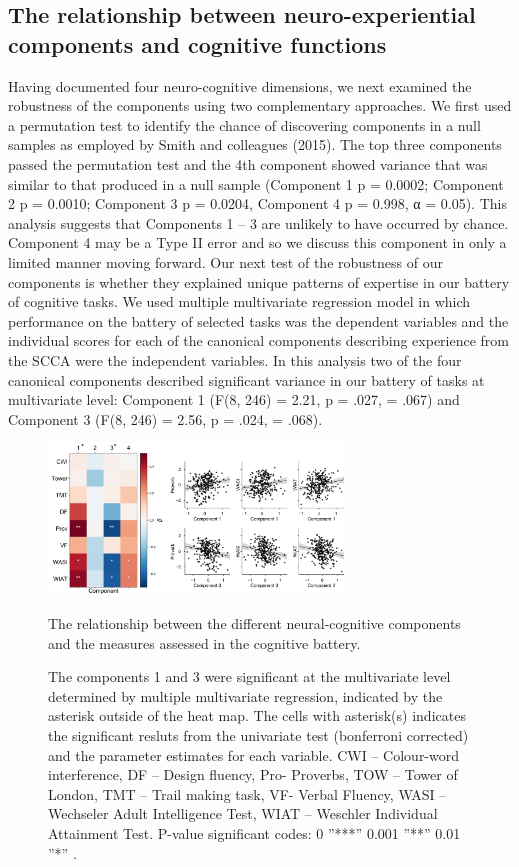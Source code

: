 \subsection{The relationship between neuro-experiential components and cognitive functions}
\label{study2:results:manova}
Having documented four neuro-cognitive dimensions, we next examined the robustness of the components using two complementary approaches. We first used a permutation test to identify the chance of discovering components in a null samples as employed by Smith and colleagues (2015). The top three components passed the permutation test and the 4th component showed variance that was similar to that produced in a null sample (Component 1 p = 0.0002; Component 2 p = 0.0010; Component 3 p = 0.0204, Component 4 p = 0.998, α = 0.05). This analysis suggests that Components 1 – 3 are unlikely to have occurred by chance. Component 4 may be a Type II error and so we discuss this component in only a limited manner moving forward.
Our next test of the robustness of our components is whether they explained unique patterns of expertise in our battery of cognitive tasks. We used multiple multivariate regression model in which performance on the battery of selected tasks was the dependent variables and the individual scores for each of the canonical components describing experience from the SCCA were the independent variables. In this analysis two of the four canonical components described significant variance in our battery of tasks at multivariate level: Component 1 (F(8, 246) = 2.21, p = .027, \paretasquared = .067) and Component 3 (F(8, 246) = 2.56, p = .024, \paretasquared = .068). 
\begin{figure}[H]
    \centering
    \includegraphics[width=0.7\textwidth]{chapters/img/study2fig3.png}
    \caption{The relationship between the different neural-cognitive components and the measures assessed in the cognitive battery.} 
    \caption*{
    \footnotesize{
    The components 1 and 3 were significant at the multivariate level determined by multiple multivariate regression, indicated by the asterisk outside of the heat map. The cells with asterisk(s) indicates the significant resluts from the univariate test (bonferroni corrected) and the parameter estimates for each variable. CWI – Colour-word interference, DF – Design fluency, Pro- Proverbs, TOW – Tower of London, TMT – Trail making task, VF- Verbal Fluency, WASI – Wechseler Adult Intelligence Test, WIAT – Weschler Individual Attainment Test. P-value significant codes:  0 ”***” 0.001 ”**” 0.01 ”*” .}
    }
    \label{fig:study2:fig3}
\end{figure}
